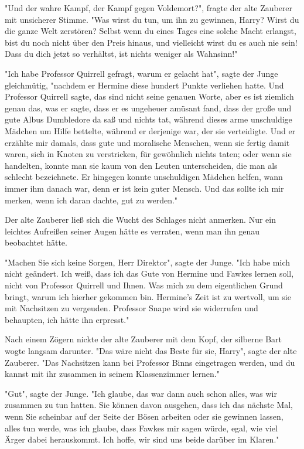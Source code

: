 {"Und der wahre Kampf, der Kampf gegen Voldemort?", fragte der alte Zauberer mit unsicherer Stimme. "Was wirst du tun, um ihn zu gewinnen, Harry? Wirst du die ganze Welt zerstören? Selbst wenn du eines Tages eine solche Macht erlangst, bist du noch nicht über den Preis hinaus, und vielleicht wirst du es auch nie sein! Dass du dich jetzt so verhältst, ist nichts weniger als Wahnsinn!"

"Ich habe Professor Quirrell gefragt, warum er gelacht hat", sagte der Junge gleichmütig, "nachdem er Hermine diese hundert Punkte verliehen hatte. Und Professor Quirrell sagte, das sind nicht seine genauen Worte, aber es ist ziemlich genau das, was er sagte, dass er es ungeheuer amüsant fand, dass der große und gute Albus Dumbledore da saß und nichts tat, während dieses arme unschuldige Mädchen um Hilfe bettelte, während er derjenige war, der sie verteidigte. Und er erzählte mir damals, dass gute und moralische Menschen, wenn sie fertig damit waren, sich in Knoten zu verstricken, für gewöhnlich nichts taten; oder wenn sie handelten, konnte man sie kaum von den Leuten unterscheiden, die man als schlecht bezeichnete. Er hingegen konnte unschuldigen Mädchen helfen, wann immer ihm danach war, denn er ist kein guter Mensch. Und das sollte ich mir merken, wenn ich daran dachte, gut zu werden."

Der alte Zauberer ließ sich die Wucht des Schlages nicht anmerken. Nur ein leichtes Aufreißen seiner Augen hätte es verraten, wenn man ihn genau beobachtet hätte.

"Machen Sie sich keine Sorgen, Herr Direktor", sagte der Junge. "Ich habe mich nicht geändert. Ich weiß, dass ich das Gute von Hermine und Fawkes lernen soll, nicht von Professor Quirrell und Ihnen. Was mich zu dem eigentlichen Grund bringt, warum ich hierher gekommen bin. Hermine's Zeit ist zu wertvoll, um sie mit Nachsitzen zu vergeuden. Professor Snape wird sie widerrufen und behaupten, ich hätte ihn erpresst."

Nach einem Zögern nickte der alte Zauberer mit dem Kopf, der silberne Bart wogte langsam darunter. "Das wäre nicht das Beste für sie, Harry", sagte der alte Zauberer. "Das Nachsitzen kann bei Professor Binns eingetragen werden, und du kannst mit ihr zusammen in seinem Klassenzimmer lernen."

"Gut", sagte der Junge. "Ich glaube, das war dann auch schon alles, was wir zusammen zu tun hatten. Sie können davon ausgehen, dass ich das nächste Mal, wenn Sie scheinbar auf der Seite der Bösen arbeiten oder sie gewinnen lassen, alles tun werde, was ich glaube, dass Fawkes mir sagen würde, egal, wie viel Ärger dabei herauskommt. Ich hoffe, wir sind uns beide darüber im Klaren."

}
